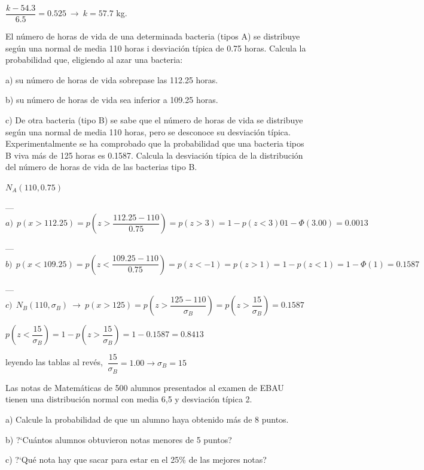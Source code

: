 $ \dfrac{k-54.3}{6.5}=0.525 \ \to \ k=57.7$ kg.


\vspace{4mm}
\begin{ejemplo}
\begin{ejer}
	El número de horas de vida de una determinada bacteria (tipos A) se distribuye según una normal de media 110 horas i desviación típica de 0.75 horas. Calcula la probabilidad que, eligiendo al azar una bacteria:
	
a) su número de horas de vida sobrepase las 112.25 horas. 

b) su número de horas de vida sea inferior a 109.25 horas.

c) De otra bacteria (tipo B) se sabe que el número de horas de vida se distribuye según una normal de media 110 horas, pero se desconoce su desviación típica. Experimentalmente se ha comprobado que la probabilidad que una bacteria tipos B viva más de 125 horas es 0.1587. Calcula la desviación típica de la distribución del número de horas de vida de las bacterias tipo B. 


\end{ejer}
\end{ejemplo}
$N_A(110,0.75)$

--- $a)\ \ p(x>112.25)= p\left(z> \dfrac{112.25-110}{0.75} \right)=p(z> 3 )=1-p(z<3)01-\Phi(3.00)=0.0013$

--- $b)\ \ p(x<109.25)= p\left(z< \dfrac{109.25-110}{0.75} \right) =p(z<-1)=p(z>1)=1-p(z<1)=1-\Phi(1)=0.1587$

--- $c)\ \ N_B(110,\sigma_B) \ \to \ p(x>125)= p\left( z>\dfrac{125-110}{\sigma_B} \right)= p \left( z>\dfrac{15}{\sigma_B} \right)=0.1587$

$p \left( z<\dfrac{15}{\sigma_B} \right)=1-p\left( z>\dfrac{15} {\sigma_B} \right)=1-0.1587=0.8413$

leyendo las tablas al revés, $\ \dfrac{15}{\sigma_B}=1.00 \to \sigma_B=15$


\vspace{4mm}
\begin{ejemplo}
\begin{ejer}
	Las notas de Matemáticas de 500 alumnos presentados al examen de EBAU tienen una distribución normal con media 6,5 y desviación típica 2.
           
 a) Calcule la probabilidad de que un alumno haya obtenido más de 8 puntos. 
 
 b) ?`Cuántos alumnos obtuvieron notas menores de 5 puntos?
 
 c) ?`Qué nota hay que sacar para estar en el 25\% de las mejores notas?
\end{ejer}
\end{ejemplo}

